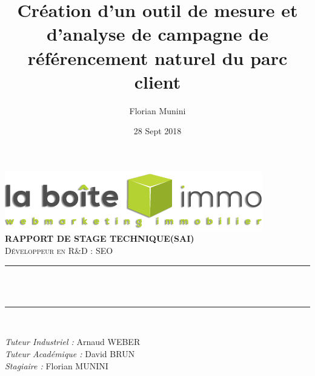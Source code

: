 \documentclass[12pt]{article}
\title{Création d'un outil de mesure et d'analyse de campagne de référencement naturel du parc client}								%
\author{Florian Munini}								%
\date{28 Sept 2018}	%
\makeatletter
\let\thetitle\@title
\makeatother
\begin{document}

\begin{titlepage}
	\centering
    \includegraphics[scale = 1]{lbi.png}\\[4.0 cm]
    \vspace*{0.5 cm}
    \textsc{\LARGE \bfseries RAPPORT DE STAGE TECHNIQUE\newline\newline (SAI)}\\[2.0 cm]
	\textsc{\Large Développeur en R\&D : SEO}\\[0.5 cm]				%
	\rule{\linewidth}{0.2 mm} \\[0.4 cm]
    \textsc{\Large \thetitle}\\[0.5 cm]
	\rule{\linewidth}{0.2 mm} \\[1.5 cm]
	
	\begin{minipage}{1\textwidth}
		\begin{centering} \large
			\emph{Tuteur Industriel : }Arnaud WEBER\\
			\emph{Tuteur Académique : }David BRUN\\
            \emph{Stagiaire : }Florian MUNINI\\
		\end{centering}
	\end{minipage}
   
\end{titlepage}


\tableofcontents


\afterpage
\clearpage
\newpage

\setcounter{page}{3}
\setcounter{secnumdepth}{0}
\end{document}
